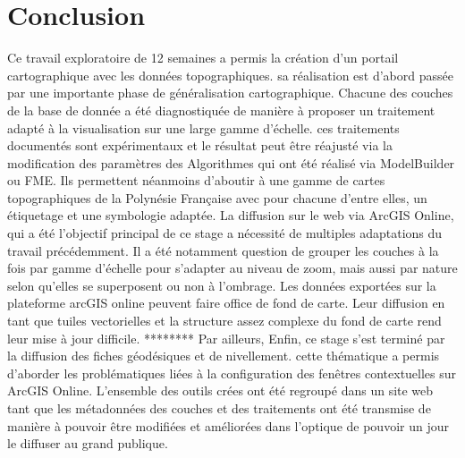\documentclass{themeensg}
\begin{document}
\chapter*{Conclusion}
  \vspace{1.5cm}
    Ce travail exploratoire de 12 semaines a permis la création d'un portail cartographique avec les données topographiques. sa réalisation est d'abord passée par une importante phase de généralisation cartographique. Chacune des couches de la base de donnée a été diagnostiquée de manière à proposer un traitement adapté à la visualisation sur une large gamme d'échelle. ces traitements documentés sont expérimentaux et le résultat peut être réajusté via la modification des paramètres des Algorithmes qui ont été réalisé via ModelBuilder ou FME. Ils permettent néanmoins d'aboutir à une gamme de cartes topographiques de la Polynésie Française avec pour chacune d'entre elles, un étiquetage et une symbologie adaptée. La diffusion sur le web via ArcGIS Online, qui a été l'objectif principal de ce stage a nécessité de multiples adaptations du travail précédemment. Il a été notamment question de grouper les couches à la fois par gamme d'échelle pour s'adapter au niveau de zoom, mais aussi par nature selon qu'elles se superposent ou non à l'ombrage. Les données exportées sur la plateforme arcGIS online peuvent faire office de fond de carte. Leur diffusion en tant que tuiles vectorielles et la structure assez complexe du fond de carte rend leur mise à jour difficile. ******** Par ailleurs,   Enfin, ce stage s'est terminé par la diffusion des fiches géodésiques et de nivellement. cette thématique a permis d'aborder les problématiques liées à la configuration des fenêtres contextuelles sur ArcGIS Online. L'ensemble des outils crées ont été regroupé dans un site web tant que les métadonnées des couches et des traitements ont été transmise de manière à pouvoir être modifiées et améliorées dans l'optique de pouvoir un jour le diffuser au grand publique.


\newevenpage
\printbibliography[title={Bibliographie}]
\nocite{*}

\newevenpage
\listoffigures

\newevenpage
\listoftables
\end{document}
